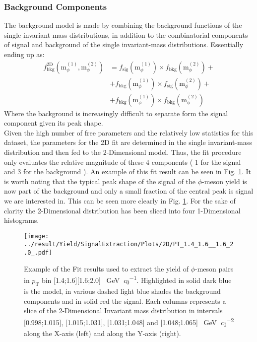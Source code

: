 \subsubsection{Background Components} The background model is made by combining the background functions of the single invariant-mass distributions, in addition to the combinatorial components of signal and background of the single invariant-mass distributions. Essentially ending up as:
\begin{eqnarray}
 f^{\text{2D}}_{\text{bkg}}(\text{m}_{\phi}^{(1)},\text{m}_{\phi}^{(2)}) &= f_{\text{sig}}(\text{m}_{\phi}^{(1)}) \times  f_{\text{bkg}}(\text{m}_{\phi}^{(2)}) +\\
&+ f_{\text{bkg}}(\text{m}_{\phi}^{(1)}) \times  f_{\text{sig}}(\text{m}_{\phi}^{(2)}) +\\
&+ f_{\text{bkg}}(\text{m}_{\phi}^{(1)}) \times  f_{\text{bkg}}(\text{m}_{\phi}^{(2)}) 
\end{eqnarray}
Where the background is increasingly difficult to separate form the signal component given its peak shape.\\
\indent Given the high number of free parameters and the relatively low statistics for this dataset, the parameters  for the 2D fit are determined in the single invariant-mass distribution and then fed to the 2-Dimensional model. Thus, the fit procedure only evaluates the relative magnitude of these 4 components ( 1 for the signal and 3 for the background ). An example of this fit result can be seen in Fig. \ref{fig:2Dfit}. It is worth noting that the typical peak shape of the signal of the $\phi$-meson yield is now part of the background and only a small fraction of the central peak is signal we are interested in. This can be seen more clearly in Fig. \ref{fig:2Dfit}. For the sake of clarity the 2-Dimensional distribution has been sliced into four 1-Dimensional histograms.

\begin{figure}
\centering
\texttt{[image: ../result/Yield/SignalExtraction/Plots/2D/PT\_1.4\_1.6\_\_1.6\_2.0\_.pdf]}
\caption{Example of the Fit results used to extract the yield of $\phi$-meson pairs in $p_{\text{T}}$ bin [1.4;1.6][1.6;2.0] \SI{}{\giga\electronvolt \per \clight}. Highlighted in solid dark blue is the model, in various dashed light blue shades the background components and in solid red the signal. Each columns represents a slice of the 2-Dimensional Invariant mass distribution in intervals [0.998;1.015], [1.015;1.031], [1.031;1.048] and [1.048;1.065] \SI{}{\giga\electronvolt \per \clight \squared} along the X-axis (left) and along the Y-axis (right).}
\label{fig:2Dfit}
\end{figure}
